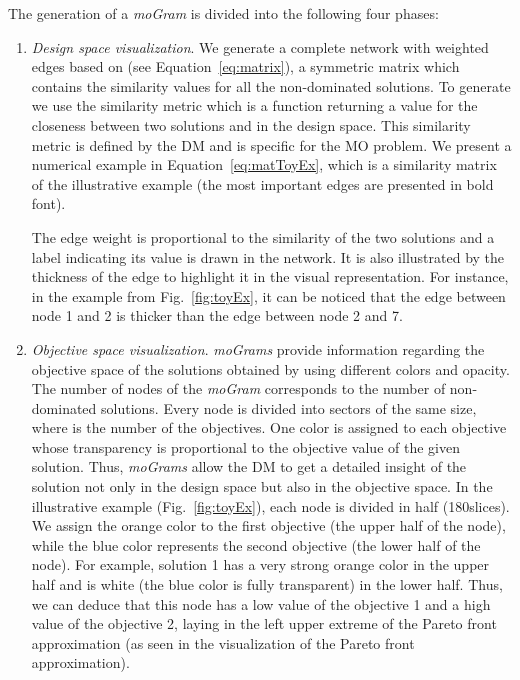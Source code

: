 \documentclass[journal]{IEEEtran}
\begin{document}
The generation of a \emph{moGram} is divided into the following four phases:
\begin{enumerate}

 \item \emph{Design space visualization}. We generate a complete network with weighted edges based on  (see Equation~\ref{eq:matrix}), a  symmetric matrix which contains the similarity values for all the non-dominated solutions. To generate  we use the similarity metric  which is a function returning a value for the closeness between two solutions  and  in the design space. This similarity metric is defined by the DM and is specific for the MO problem. We present a numerical example in Equation~\ref{eq:matToyEx}, which is a similarity matrix of the illustrative example (the most important edges are presented in bold font).
 






The edge weight is proportional to the similarity of the two solutions and a label indicating its value is drawn in the network. It is also illustrated by the thickness of the edge to highlight it in the visual representation. For instance, in the example from Fig.~\ref{fig:toyEx}, it can be noticed that the edge between node 1 and 2 is thicker than the edge between node 2 and 7.

 \item \emph{Objective space visualization}. \emph{moGrams} provide information regarding the objective space of the solutions obtained by using different colors and opacity. 
The number of nodes of the \emph{moGram} corresponds to the number of non-dominated solutions. Every node is divided into  sectors of the same size, where  is the number of the objectives. One color is assigned to each objective whose transparency is proportional to the objective value of the given solution. Thus, \emph{moGrams} allow the DM to get a detailed insight of the solution not only in the design space but also in the objective space. 
 In the illustrative example (Fig.~\ref{fig:toyEx}), each node is divided in half (180\degree slices). We assign the orange color to the first objective (the upper half of the node), while the blue color represents the second objective (the lower half of the node). For example, solution 1 has a very strong orange color in the upper half and is white (the blue color is fully transparent) in the lower half. Thus, we can deduce that this node has a low value of the objective 1 and a high value of the objective 2, laying in the left upper extreme of the Pareto front approximation (as seen in the visualization of the Pareto front approximation). 


\end{enumerate}
\end{document}
